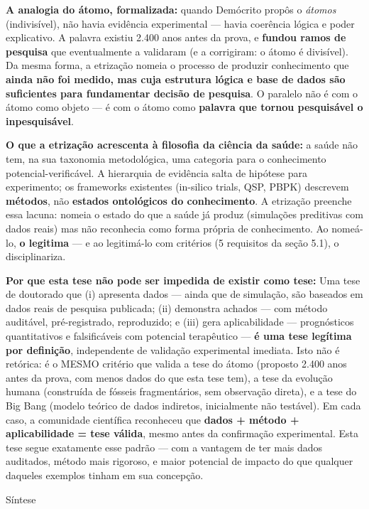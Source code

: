 \documentclass[12pt,a4paper,oneside]{report}
\begin{document}
\textbf{A analogia do átomo, formalizada:} quando Demócrito propôs o
\emph{átomos} (indivisível), não havia evidência experimental --- havia
coerência lógica e poder explicativo. A palavra existiu 2.400 anos antes
da prova, e \textbf{fundou ramos de pesquisa} que eventualmente a
validaram (e a corrigiram: o átomo é divisível). Da mesma forma, a
etrização nomeia o processo de produzir conhecimento que \textbf{ainda
não foi medido, mas cuja estrutura lógica e base de dados são
suficientes para fundamentar decisão de pesquisa}. O paralelo não é com
o átomo como objeto --- é com o átomo como \textbf{palavra que tornou
pesquisável o inpesquisável}.

\textbf{O que a etrização acrescenta à filosofia da ciência da saúde:} a
saúde não tem, na sua taxonomia metodológica, uma categoria para o
conhecimento potencial-verificável. A hierarquia de evidência salta de
hipótese para experimento; os frameworks existentes (in-silico trials,
QSP, PBPK) descrevem \textbf{métodos}, não \textbf{estados ontológicos
do conhecimento}. A etrização preenche essa lacuna: nomeia o estado do
que a saúde já produz (simulações preditivas com dados reais) mas não
reconhecia como forma própria de conhecimento. Ao nomeá-lo, \textbf{o
legitima} --- e ao legitimá-lo com critérios (5 requisitos da seção
5.1), o disciplinariza.

\textbf{Por que esta tese não pode ser impedida de existir como tese:}
Uma tese de doutorado que (i) apresenta dados --- ainda que de
simulação, são baseados em dados reais de pesquisa publicada; (ii)
demonstra achados --- com método auditável, pré-registrado, reproduzido;
e (iii) gera aplicabilidade --- prognósticos quantitativos e
falsificáveis com potencial terapêutico --- \textbf{é uma tese legítima
por definição}, independente de validação experimental imediata. Isto
não é retórica: é o MESMO critério que valida a tese do átomo (proposto
2.400 anos antes da prova, com menos dados do que esta tese tem), a tese
da evolução humana (construída de fósseis fragmentários, sem observação
direta), e a tese do Big Bang (modelo teórico de dados indiretos,
inicialmente não testável). Em cada caso, a comunidade científica
reconheceu que \textbf{dados + método + aplicabilidade = tese válida},
mesmo antes da confirmação experimental. Esta tese segue exatamente esse
padrão --- com a vantagem de ter mais dados auditados, método mais
rigoroso, e maior potencial de impacto do que qualquer daqueles exemplos
tinham em sua concepção.

Síntese
\end{document}
